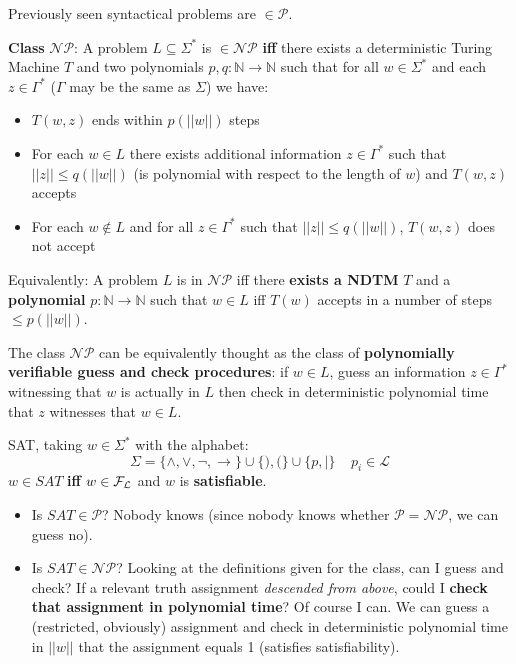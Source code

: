 	\noindent
	Previously seen syntactical problems are $\in \mathcal{P}$.
	\begin{definition} \textbf{Class} $\mathcal{NP}$: A problem $L \subseteq \Sigma^\ast$ is $\in \mathcal{NP}$ \textbf{iff} there exists a deterministic Turing Machine $T$ and two polynomials $p,q:\mathbb{N} \rightarrow \mathbb{N}$ such that for all $w \in \Sigma^\ast$ and each $z \in \Gamma^\ast$ ($\Gamma$ may be the same as $\Sigma$) we have:
	\begin{itemize}
		\item $T(w,z)$ ends within $p(||w||)$ steps
		\item For each $w \in L$ there exists additional information $z \in \Gamma^\ast$ such that $||z|| \leq q (||w||)$ (is polynomial with respect to the length of $w$) and $T(w,z)$ accepts
		\item For each $w \notin L$ and for all $z \in \Gamma^\ast$ such that $||z|| \leq q(||w||)$, $T(w,z)$ does not accept
	\end{itemize}
	\end{definition}

	\noindent
	Equivalently: A problem $L$ is in $\mathcal{NP}$ iff there \textbf{exists a NDTM} $T$ and a \textbf{polynomial} $p: \mathbb{N} \rightarrow \mathbb{N}$ such that $w \in L$ iff $T(w)$ accepts in a number of steps $\leq p(||w||)$.

	The class $\mathcal{NP}$ can be equivalently thought as the class of \textbf{polynomially verifiable guess and check procedures}: if $w \in L$, guess an information $z \in \Gamma^\ast$ witnessing that $w$ is actually in $L$ then check in deterministic polynomial time that $z$ witnesses that $w \in L$.

	\begin{example} SAT, taking $w \in \Sigma^\ast$ with the alphabet:
	$$ \Sigma = \{\wedge, \vee, \neg, \rightarrow\} \cup \{),(\} \cup \{p, |\} \;\;\;\; p_i \in \mathcal{L} $$
	$w \in SAT$ \textbf{iff} $w \in \mathcal{F}_\mathcal{L}$ and $w$ is \textbf{satisfiable}.

	\begin{itemize}
	\item Is $SAT \in \mathcal{P}$? Nobody knows (since nobody knows whether $\mathcal{P} = \mathcal{NP}$, we can guess no).

	\item Is $SAT \in \mathcal{NP}$? Looking at the definitions given for the class, can I guess and check? If a relevant truth assignment \textit{descended from above}, could I \textbf{check that assignment in polynomial time}? Of course I can. We can guess a (restricted, obviously) assignment and check in deterministic polynomial time in $||w||$ that the assignment equals 1 (satisfies satisfiability).
	\end{itemize}
	\end{example}

